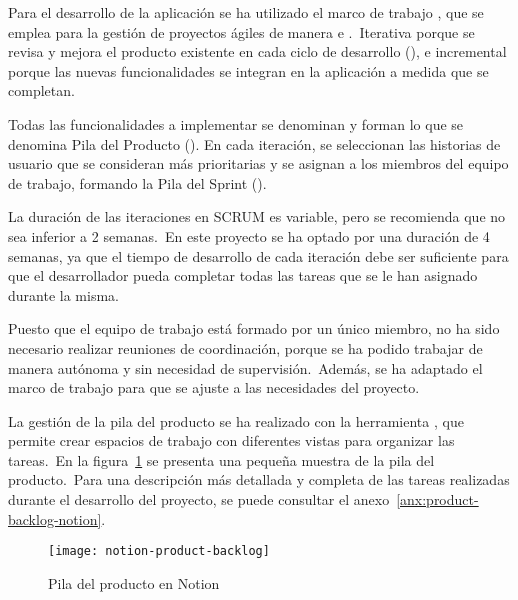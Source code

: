 
Para el desarrollo de la aplicación se ha utilizado el marco de trabajo , que se emplea para la gestión
de proyectos ágiles de manera  e .\ Iterativa porque se revisa y mejora
el producto existente en cada ciclo de desarrollo (), e incremental porque las nuevas
funcionalidades se integran en la aplicación a medida que se completan.

Todas las funcionalidades a implementar se
denominan  y forman lo que se denomina Pila del Producto ().
En cada iteración, se seleccionan las historias de usuario que se consideran más prioritarias y se asignan a los
miembros del equipo de trabajo, formando la Pila del Sprint ().

La duración de las iteraciones en SCRUM es variable, pero se recomienda que no sea inferior a 2 semanas.\ En este
proyecto se ha optado por una duración de 4 semanas, ya que el tiempo de desarrollo de cada iteración debe ser
suficiente para que el desarrollador pueda completar todas las tareas que se le han asignado durante la misma.

Puesto que el equipo de trabajo está formado por un único miembro, no ha sido necesario realizar reuniones de
coordinación, porque se ha podido trabajar de manera autónoma y sin necesidad de supervisión.\ Además, se ha
adaptado el marco de trabajo para que se ajuste a las necesidades del proyecto.

La gestión de la pila del producto se ha realizado con la herramienta , que permite crear espacios
de trabajo con diferentes vistas para organizar las tareas.\ En la figura~\ref{fig:notion-product-backlog} se presenta
una pequeña muestra de la pila del producto.\ Para una descripción más detallada y completa de las tareas realizadas
durante el desarrollo del proyecto, se puede consultar el anexo~\ref{anx:product-backlog-notion}.

\begin{figure}[H]
	\centering
	\texttt{[image: notion-product-backlog]}
	\caption{Pila del producto en Notion}
	\label{fig:notion-product-backlog}
\end{figure}


